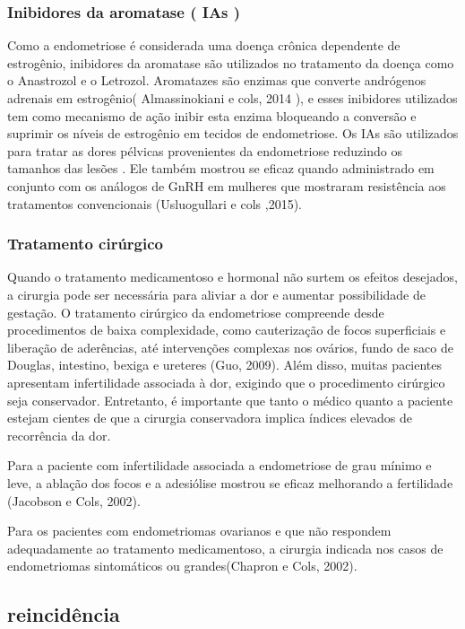 \documentclass[12pt]{article} %
\begin{document}
\subsubsection{Inibidores da aromatase ( IAs )}

Como a endometriose é considerada uma doença crônica dependente de estrogênio, inibidores da aromatase são utilizados no tratamento da doença como o Anastrozol e o Letrozol. Aromatazes são enzimas que converte andrógenos adrenais em estrogênio( Almassinokiani e cols, 2014 ), e esses inibidores utilizados tem como mecanismo de ação inibir esta enzima bloqueando a conversão e suprimir os níveis de estrogênio em tecidos de endometriose. Os IAs são utilizados para tratar as dores pélvicas provenientes da endometriose reduzindo os tamanhos das lesões . Ele também mostrou se eficaz quando administrado em conjunto com os análogos de GnRH em mulheres que mostraram resistência aos tratamentos convencionais (Usluogullari e cols ,2015).




\subsubsection{Tratamento cirúrgico}


Quando o tratamento medicamentoso e hormonal não surtem os efeitos desejados, a cirurgia pode ser necessária para aliviar a dor e aumentar possibilidade de gestação. 
O tratamento cirúrgico da endometriose compreende desde procedimentos de baixa complexidade, como cauterização de focos superficiais e liberação de aderências, até intervenções complexas nos ovários, fundo de saco de Douglas, intestino, bexiga e ureteres (Guo, 2009). Além disso, muitas pacientes apresentam infertilidade associada à dor, exigindo que o procedimento cirúrgico seja conservador. Entretanto, é importante que tanto o médico quanto a paciente estejam cientes de que a cirurgia conservadora implica índices elevados de recorrência da dor.

Para a paciente com infertilidade associada a endometriose de grau mínimo e leve, a ablação dos focos e a adesiólise mostrou se eficaz melhorando a fertilidade (Jacobson e Cols, 2002).

Para os pacientes com endometriomas ovarianos e que não respondem adequadamente ao tratamento medicamentoso, a cirurgia indicada nos casos de endometriomas sintomáticos ou
grandes(Chapron e Cols, 2002).


\subsection{reincidência}
\end{document}
